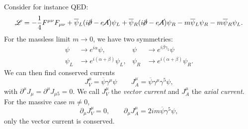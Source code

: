 Consider for instance QED:
\begin{equation}
  \mathscr{L} = -\frac{1}{4} F^{\mu\nu} F_{\mu\nu} + \overline{\psi}{}_L (i \cancel{\partial} - e \cancel{A}) \psi_L + \overline{\psi}{}_R (i \cancel{\partial} - e \cancel{A})\psi_R - m \overline{\psi}{}_L \psi_R - m \overline{\psi}{}_R \psi_L.
\end{equation}
For the massless limit $m \to 0$, we have two symmetries:
\begin{align}
  \psi &\to e^{i \alpha} \psi, & \psi &\to e^{i \beta \gamma_5} \psi \label{eq:17-sym} \\
  \psi_L & \to e^{i (\alpha + \beta)} \psi_L, & \psi_R &\to e^{i(\alpha + \beta)} \psi_R.
\end{align}
We can then find conserved currents
\begin{equation}
  J_V^{\mu} = \overline{\psi}{}\gamma^{\mu} \psi \qquad J_A^{\mu} = \overline{\psi}{} \gamma^{\mu} \gamma^5 \psi,
\end{equation}
with $\partial^{\mu} J_{\mu} = \partial^{\mu} J_{\mu 5} = 0$.
We call $J_V^{\mu}$ the \emph{vector current} and $J_A^{\mu}$ the \emph{axial current}.
For the massive case $m \neq 0$, 
\begin{equation}
  \partial_{\mu} J_V^{\mu} = 0, \qquad \partial_{\mu} J_A^{\mu} = 2 i m \overline{\psi}{} \gamma^5 \psi,
\end{equation}
only the vector current is conserved.

